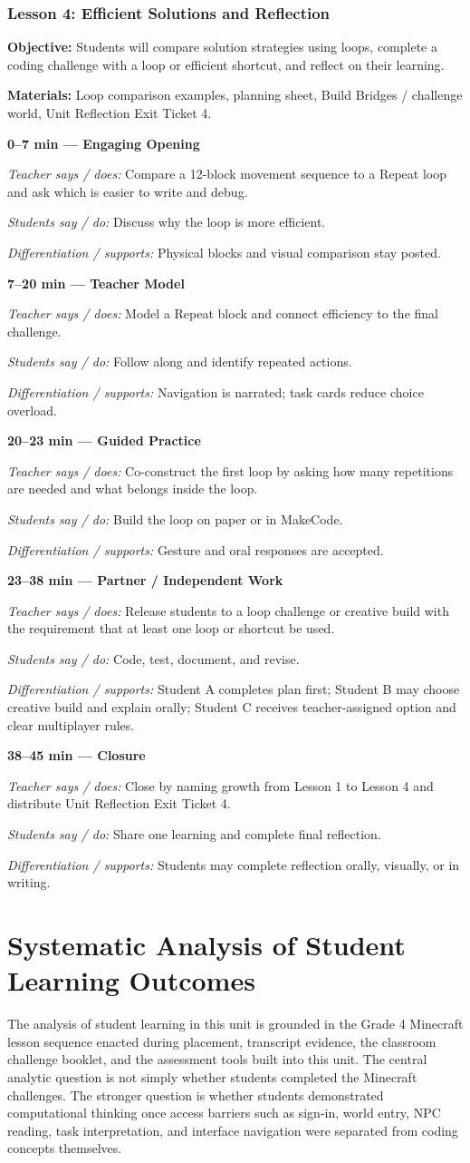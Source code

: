 \documentclass[12pt]{article}
\newcommand{\lessonphase}[5]{%
\noindent\textbf{\color{brickRed}#1 --- #2}\par
\textit{Teacher says / does:} #3\par
\textit{Students say / do:} #4\par
\textit{Differentiation / supports:} #5\par\medskip
}
\begin{document}
\subsubsection*{Lesson 4: Efficient Solutions and Reflection}
\textbf{Objective:} Students will compare solution strategies using loops, complete a coding challenge with a loop or efficient shortcut, and reflect on their learning.\par
\textbf{Materials:} Loop comparison examples, planning sheet, Build Bridges / challenge world, Unit Reflection Exit Ticket 4.\par
\begin{designbox}
\lessonphase{0--7 min}{Engaging Opening}{Compare a 12-block movement sequence to a Repeat loop and ask which is easier to write and debug.}{Discuss why the loop is more efficient.}{Physical blocks and visual comparison stay posted.}
\lessonphase{7--20 min}{Teacher Model}{Model a Repeat block and connect efficiency to the final challenge.}{Follow along and identify repeated actions.}{Navigation is narrated; task cards reduce choice overload.}
\lessonphase{20--23 min}{Guided Practice}{Co-construct the first loop by asking how many repetitions are needed and what belongs inside the loop.}{Build the loop on paper or in MakeCode.}{Gesture and oral responses are accepted.}
\lessonphase{23--38 min}{Partner / Independent Work}{Release students to a loop challenge or creative build with the requirement that at least one loop or shortcut be used.}{Code, test, document, and revise.}{Student A completes plan first; Student B may choose creative build and explain orally; Student C receives teacher-assigned option and clear multiplayer rules.}
\lessonphase{38--45 min}{Closure}{Close by naming growth from Lesson 1 to Lesson 4 and distribute Unit Reflection Exit Ticket 4.}{Share one learning and complete final reflection.}{Students may complete reflection orally, visually, or in writing.}
\end{designbox}

\section{Systematic Analysis of Student Learning Outcomes}
The analysis of student learning in this unit is grounded in the Grade 4 Minecraft lesson sequence enacted during placement, transcript evidence, the classroom challenge booklet, and the assessment tools built into this unit. The central analytic question is not simply whether students completed the Minecraft challenges. The stronger question is whether students demonstrated computational thinking once access barriers such as sign-in, world entry, NPC reading, task interpretation, and interface navigation were separated from coding concepts themselves.
\end{document}
